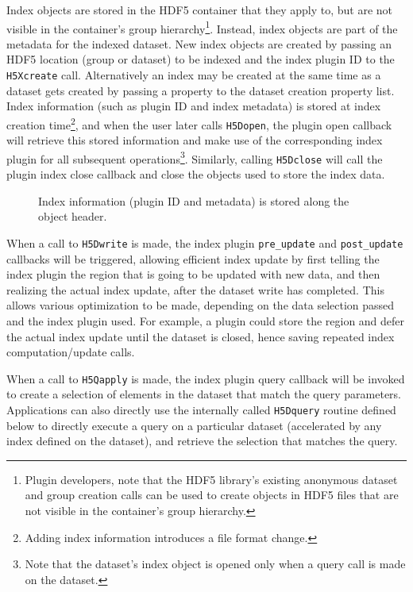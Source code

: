 Index objects are stored in the HDF5 container that they apply to, but are not
visible in the container's group hierarchy\footnote{Plugin developers, note that
the HDF5 library's existing anonymous dataset and group creation calls can be
used to create objects in HDF5 files that are not visible in the container's
group hierarchy.}.
Instead, index objects are part of the metadata for the indexed dataset. New index
objects are created by passing an HDF5 location (group or dataset) to be indexed
and the index plugin ID to the \texttt{H5Xcreate} call.
Alternatively an index may be created at the same time as a dataset gets created
by passing a property to the dataset creation property list.
Index information (such as plugin ID and index metadata) is stored at index
creation time\footnote{Adding index information introduces a file format change.},
and when the user later calls \texttt{H5Dopen}, the plugin open
callback will retrieve this stored information and make use of the corresponding
index plugin for all subsequent operations\footnote{Note that the dataset's
index object is opened only when a query call is made on the dataset.}.
Similarly, calling \texttt{H5Dclose}
will call the plugin index close callback and close the objects used to store
the index data.

\begin{figure}

\caption{Index information (plugin ID and metadata) is stored along the object header.}
\label{fig:hdf5_index}
\vspace{-20pt}
\end{figure}

When a call to \texttt{H5Dwrite} is made, the index plugin \texttt{pre\_update} and
\texttt{post\_update} callbacks will be triggered, allowing efficient index
update by first telling the index plugin the region that is going to be updated
with new data, and then realizing the actual index update, after the dataset
write has completed. This allows various optimization to be made, depending on
the data selection passed and the index plugin used. For example, a plugin could
store the region and defer the actual index update until the dataset is closed,
hence saving repeated index computation/update calls.

When a call to \texttt{H5Qapply} is made, the index plugin query callback will be
invoked to create a selection of elements in the dataset that match the query
parameters. Applications can also directly use the internally called
\texttt{H5Dquery} routine defined below
to directly execute a query on a particular dataset (accelerated by any index defined on the dataset),
and retrieve the selection that matches the query.

